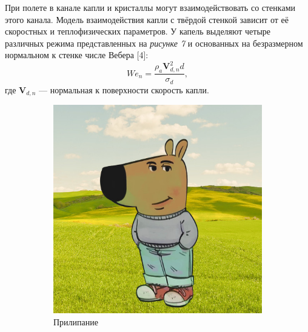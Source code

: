 При полете в канале капли и кристаллы могут взаимодействовать со стенками этого канала. Модель взаимодействия капли с твёрдой стенкой зависит от её скоростных и теплофизических параметров. У капель выделяют четыре различных режима представленных на \textit{рисунке 7} и основанных на безразмерном нормальном к стенке числе Вебера [4]:
\begin{equation}
	We_n = \frac{\rho_a \mathbf{V}_{d,n}^2 d}{\sigma_d},
\end{equation}
где $\mathbf{V}_{d,n}$ --- нормальная к поверхности скорость капли.

\begin{figure}[H]
	\centering
	
	\begin{subfigure}[t]{0.45\textwidth}
		\centering
		\includegraphics[width=\textwidth]{figures/chill-guy.jpeg}
		\caption{Прилипание}
		\label{fig:sub1}
	\end{subfigure}
	\hfill
	\begin{subfigure}[t]{0.45\textwidth}
		\centering

\end{subfigure}
\end{figure}
